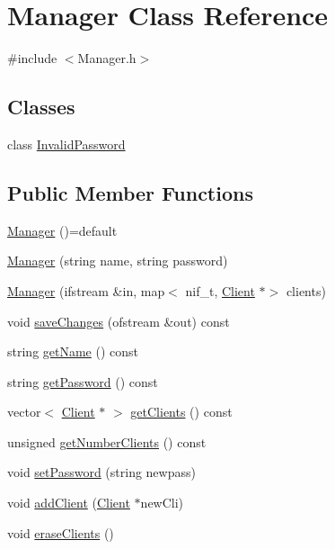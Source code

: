 \hypertarget{class_manager}{}\section{Manager Class Reference}
\label{class_manager}


{\ttfamily \#include $<$Manager.\+h$>$}

\subsection*{Classes}
\begin{DoxyCompactItemize}
\item 
class \hyperlink{class_manager_1_1_invalid_password}{Invalid\+Password}
\end{DoxyCompactItemize}
\subsection*{Public Member Functions}
\begin{DoxyCompactItemize}
\item 
\hyperlink{class_manager_a51c8f271f79b1c6590e9bc4ae6343bc0}{Manager} ()=default
\item 
\hyperlink{class_manager_ac2426e5aece723685d3f9fcf5db3874d}{Manager} (string name, string password)
\item 
\hyperlink{class_manager_ab76e4433a39dda934759acd696aecaea}{Manager} (ifstream \&in, map$<$ nif\+\_\+t, \hyperlink{class_client}{Client} $\ast$$>$ clients)
\item 
void \hyperlink{class_manager_ab9bd1c1c60122f3db0fca93fc4313833}{save\+Changes} (ofstream \&out) const
\item 
string \hyperlink{class_manager_ae351774d9435b59ece5d1287e9056a02}{get\+Name} () const
\item 
string \hyperlink{class_manager_a0e51eb07257a109072b7d0c9740915f3}{get\+Password} () const
\item 
vector$<$ \hyperlink{class_client}{Client} $\ast$ $>$ \hyperlink{class_manager_ac72967b5719ee6f9461923bedc8d47b7}{get\+Clients} () const
\item 
unsigned \hyperlink{class_manager_a7cbdf1fa72bc7a42be54d69ca121bc24}{get\+Number\+Clients} () const
\item 
void \hyperlink{class_manager_a19e98a7209d6218c960eb278ccbaf6cb}{set\+Password} (string newpass)
\item 
void \hyperlink{class_manager_a2c4d1978af9e2f99b4aa787973ce2c49}{add\+Client} (\hyperlink{class_client}{Client} $\ast$new\+Cli)
\item 
void \hyperlink{class_manager_ae0cc7db4e0550368657fe7c2d7d397ef}{erase\+Clients} ()
\end{DoxyCompactItemize}
